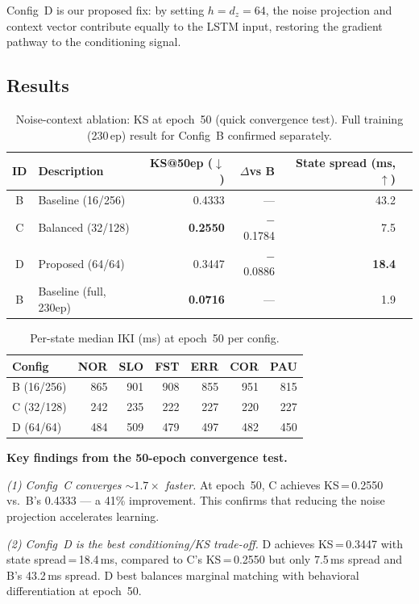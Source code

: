 \documentclass[sigconf,nonacm]{acmart}
\begin{document}
Config~D is our proposed fix: by setting $h = d_z = 64$, the noise
projection and context vector contribute equally to the LSTM input,
restoring the gradient pathway to the conditioning signal.

\subsection{Results}

\begin{table}[t]
\centering
\caption{Noise-context ablation: KS at epoch~50 (quick convergence test).
  Full training (230\,ep) result for Config~B confirmed separately.}
\begin{tabular}{clrrrr}
\toprule
ID & Description & KS@50ep ($\downarrow$) & $\Delta$vs B & State spread (ms, $\uparrow$) \\
\midrule
B & Baseline (16/256) & 0.4333 & — & 43.2 \\
C & Balanced (32/128) & \textbf{0.2550} & $-$0.1784 & 7.5 \\
D & Proposed (64/64)  & 0.3447 & $-$0.0886 & \textbf{18.4} \\
\midrule
B & Baseline (full, 230ep) & \textbf{0.0716} & — & 1.9 \\
\bottomrule
\end{tabular}
\label{tab:noise_results}
\end{table}

\begin{table}[t]
\centering
\caption{Per-state median IKI (ms) at epoch~50 per config.}
\begin{tabular}{lrrrrrr}
\toprule
Config & NOR & SLO & FST & ERR & COR & PAU \\
\midrule
B (16/256) & 865 & 901 & 908 & 855 & 951 & 815 \\
C (32/128) & 242 & 235 & 222 & 227 & 220 & 227 \\
D (64/64)  & 484 & 509 & 479 & 497 & 482 & 450 \\
\bottomrule
\end{tabular}
\label{tab:state_medians}
\end{table}

\textbf{Key findings from the 50-epoch convergence test.}

\textit{(1) Config~C converges $\sim\!1.7\times$ faster.}
At epoch~50, C achieves KS\,=\,0.2550 vs.\ B's 0.4333 --- a 41\% improvement.
This confirms that reducing the noise projection accelerates learning.

\textit{(2) Config~D is the best conditioning/KS trade-off.}
D achieves KS\,=\,0.3447 with state spread\,=\,18.4\,ms, compared to
C's KS\,=\,0.2550 but only 7.5\,ms spread and B's 43.2\,ms spread.
D best balances marginal matching with behavioral differentiation at epoch~50.
\end{document}
